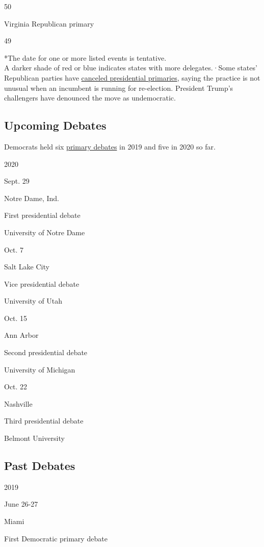 50

Virginia Republican primary

49

*The date for one or more listed events is tentative.\\
A darker shade of red or blue indicates states with more delegates.·Some
states' Republican parties have
\href{https://www.nytimes.com/2019/09/06/us/politics/states-drop-republican-primaries.html}{canceled
presidential primaries}, saying the practice is not unusual when an
incumbent is running for re-election. President Trump's challengers have
denounced the move as undemocratic.

\hypertarget{upcoming-debates}{%
\subsection{Upcoming Debates}\label{upcoming-debates}}

Democrats held six
\href{https://www.nytimes.com/news-event/democratic-debates}{primary
debates} in 2019 and five in 2020 so far.

2020

Sept. 29

Notre Dame, Ind.

First presidential debate

University of Notre Dame

Oct. 7

Salt Lake City

Vice presidential debate

University of Utah

Oct. 15

Ann Arbor

Second presidential debate

University of Michigan

Oct. 22

Nashville

Third presidential debate

Belmont University

\hypertarget{past-debates}{%
\subsection{Past Debates}\label{past-debates}}

2019

June 26-27

Miami

First Democratic primary debate

